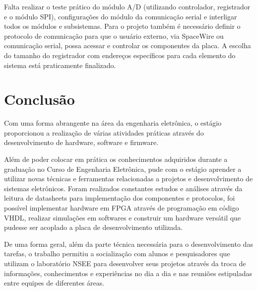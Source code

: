 \documentclass[
	12pt,				%
	openright,			%
	twoside,			%
	a4paper,			%
	english,			%
	french,				%
	spanish,			%
	brazil				%
	]{abntex2}
\begin{document}
Falta realizar o teste prático do módulo A/D (utilizando controlador, registrador e o módulo SPI), configurações do módulo da comunicação serial e interligar todos os módulos e subsistemas. Para o projeto também é necessário definir o protocolo de comunicação para que o usuário externo, via SpaceWire ou comunicação serial, possa acessar e controlar os componentes da placa. A escolha do tamanho do registrador com endereços específicos para cada elemento do sistema está praticamente finalizado.


\chapter{Conclusão}

Com uma forma abrangente na área da  engenharia eletrônica, o estágio proporcionou a realização de várias atividades práticas através do desenvolvimento de hardware, software e firmware.

Além de poder colocar em prática os conhecimentos adquiridos durante a graduação no Curso de Engenharia Eletrônica, pude com o estágio aprender a utilizar novas técnicas e ferramentas relacionadas a projetos e desenvolvimento de sistemas eletrônicos. Foram realizados constantes estudos e análises através da leitura de datasheets para implementação dos componentes e protocolos, foi possível implementar hardware em FPGA através de programação em código VHDL, realizar simulações em softwares e construir um hardware versátil que pudesse ser acoplado a placa de desenvolvimento utilizada.

De uma forma geral, além da parte técnica necessária para o desenvolvimento das tarefas, o trabalho permitiu a socialização com alunos e pesquisadores que utilizam o laboratório NSEE para desenvolver seus projetos através da troca de informações, conhecimentos e experiências no dia a dia e nas reuniões estipuladas entre equipes de diferentes áreas.\cite{InstitutodeEngenharia:Online}




\postextual
\end{document}
